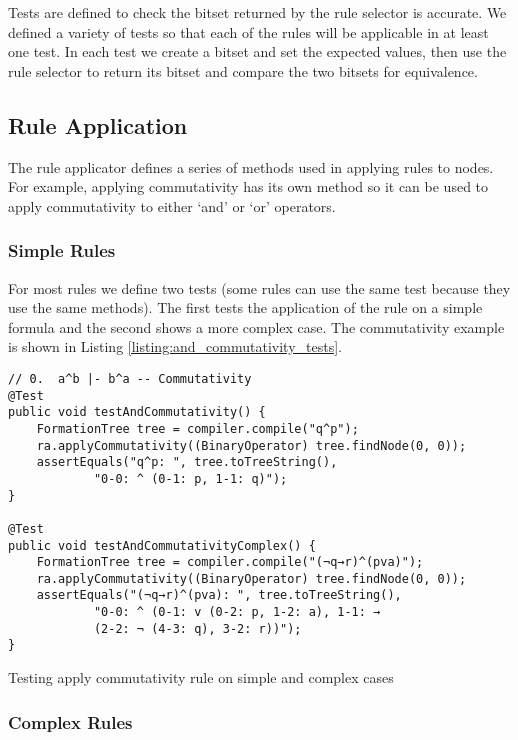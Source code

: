\documentclass[draft]{report}
\begin{document}
Tests are defined to check the bitset returned by the rule selector is accurate. We defined a variety of tests so that each of the rules will be applicable in at least one test. In each test we create a bitset and set the expected values, then use the rule selector to return its bitset and compare the two bitsets for equivalence.

\subsection{Rule Application}

The rule applicator defines a series of methods used in applying rules to nodes. For example, applying commutativity has its own method so it can be used to apply commutativity to either `and' or `or' operators.

\subsubsection{Simple Rules}

For most rules we define two tests (some rules can use the same test because they use the same methods). The first tests the application of the rule on a simple formula and the second shows a more complex case. The commutativity example is shown in Listing \ref{listing:and_commutativity_tests}.

\begin{listing}[ht]
\begin{verbatim}
// 0.  a^b |- b^a -- Commutativity
@Test
public void testAndCommutativity() {
    FormationTree tree = compiler.compile("q^p");
    ra.applyCommutativity((BinaryOperator) tree.findNode(0, 0));
    assertEquals("q^p: ", tree.toTreeString(), 
            "0-0: ^ (0-1: p, 1-1: q)");
}

@Test
public void testAndCommutativityComplex() {
    FormationTree tree = compiler.compile("(¬q→r)^(pva)");
    ra.applyCommutativity((BinaryOperator) tree.findNode(0, 0));
    assertEquals("(¬q→r)^(pva): ", tree.toTreeString(), 
            "0-0: ^ (0-1: v (0-2: p, 1-2: a), 1-1: → 
            (2-2: ¬ (4-3: q), 3-2: r))");
}
\end{verbatim}
\caption{Testing apply commutativity rule on simple and complex cases}
\label{listing:and_commutativity_tests}
\end{listing}

\subsubsection{Complex Rules}
\end{document}
